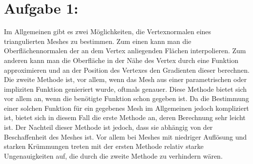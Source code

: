 \section*{Aufgabe 1: }
\begin{comment}
\begin{itemize}
\item Interpolation der anliegenden Oberflächennormalen
  \begin{itemize}
  \item[+] Leicht zu berechnen, keine Anforderungen an das Mesh
  \item[-] von Beschaffenheit des Meshes abhängig, bei Meshes mit starker Krümmung schlecht anzuwenden
  \item[-] bei Meshes mit niedriger Auflösung, die aus Funktionen generiert werden (also z.B. parametrische und implizite Oberflächen), tendentiell ungenau
  \end{itemize}
\item Approximierung der Oberfläche in der Nähe des Vertex (z.B. durch Parametrisierung) und Normale dieser Oberfläche bestimmen
  \begin{itemize}
  \item[+] Bei gegebener Oberflächenapproximierung optimale Lösung
  \item[-] Ansonsten Funktion im allgemeinen schwer zu bestimmen
  \end{itemize}
\end{itemize}
\end{comment}

Im Allgemeinen gibt es zwei Möglichkeiten, die Vertexnormalen eines triangulierten Meshes zu bestimmen. Zum einen kann man die Oberflächennormalen der an dem Vertex anliegenden Flächen interpolieren. Zum anderen kann man die Oberfläche in der Nähe des Vertex durch eine Funktion approximieren und an der Position des Vertexes den Gradienten dieser berechnen.\\
Die zweite Methode ist, vor allem, wenn das Mesh aus einer parametrischen oder impliziten Funktion genieriert wurde, oftmals genauer. Diese Methode bietet sich vor allem an, wenn die benötigte Funktion schon gegeben ist. Da die Bestimmung einer solchen Funktion für ein gegebenes Mesh im Allgemeinen jedoch kompliziert ist, bietet sich in diesem Fall die erste Methode an, deren Berechnung sehr leicht ist. Der Nachteil dieser Methode ist jedoch, dass sie abhängig von der Beschaffenheit des Meshes ist. Vor allem bei Meshes mit niedriger Auflösung und starken Krümmungen treten mit der ersten Methode relativ starke Ungenauigkeiten auf, die durch die zweite Methode zu verhindern wären.